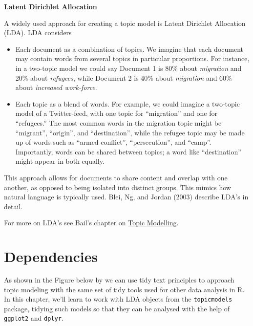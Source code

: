 \documentclass[
  letterpaper,
  DIV=11,
  numbers=noendperiod]{scrreprt}
\begin{document}
\textbf{Latent Dirichlet Allocation}

A widely used approach for creating a topic model is Latent Dirichlet
Allocation (LDA). LDA considers

\begin{itemize}
\item
  Each document as a combination of topics. We imagine that each
  document may contain words from several topics in particular
  proportions. For instance, in a two-topic model we could say Document
  1 is 80\% about \emph{migration} and 20\% about \emph{refugees}, while
  Document 2 is 40\% about \emph{migration} and 60\% about
  \emph{increased work-force}.
\item
  Each topic as a blend of words. For example, we could imagine a
  two-topic model of a Twitter-feed, with one topic for ``migration''
  and one for ``refugees.'' The most common words in the migration topic
  might be ``migrant'', ``origin'', and ``destination'', while the
  refugee topic may be made up of words such as ``armed conflict'',
  ``persecution'', and ``camp''. Importantly, words can be shared
  between topics; a word like ``destination'' might appear in both
  equally.
\end{itemize}

This approach allows for documents to share content and overlap with one
another, as opposed to being isolated into distinct groups. This mimics
how natural language is typically used. Blei, Ng, and Jordan (2003)
describe LDA's in detail.

For more on LDA's see Bail's chapter on
\href{https://sicss.io/2020/materials/day3-text-analysis/topic-modeling/rmarkdown/Topic_Modeling.html}{Topic
Modelling}.

\hypertarget{dependencies-2}{%
\section{Dependencies}\label{dependencies-2}}

As shown in the Figure below by we can use tidy text principles to
approach topic modeling with the same set of tidy tools used for other
data analysis in R. In this chapter, we'll learn to work with LDA
objects from the \texttt{topicmodels} package, tidying such models so
that they can be analysed with the help of \texttt{ggplot2} and
\texttt{dplyr}.
\end{document}
